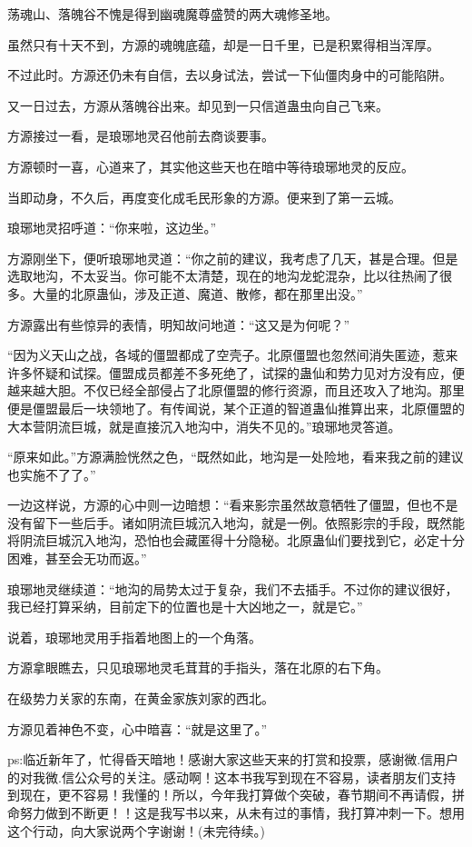 \begin{this_body}
荡魂山、落魄谷不愧是得到幽魂魔尊盛赞的两大魂修圣地。

虽然只有十天不到，方源的魂魄底蕴，却是一日千里，已是积累得相当浑厚。

不过此时。方源还仍未有自信，去以身试法，尝试一下仙僵肉身中的可能陷阱。

又一日过去，方源从落魄谷出来。却见到一只信道蛊虫向自己飞来。

方源接过一看，是琅琊地灵召他前去商谈要事。

方源顿时一喜，心道来了，其实他这些天也在暗中等待琅琊地灵的反应。

当即动身，不久后，再度变化成毛民形象的方源。便来到了第一云城。

琅琊地灵招呼道：“你来啦，这边坐。”

方源刚坐下，便听琅琊地灵道：“你之前的建议，我考虑了几天，甚是合理。但是选取地沟，不太妥当。你可能不太清楚，现在的地沟龙蛇混杂，比以往热闹了很多。大量的北原蛊仙，涉及正道、魔道、散修，都在那里出没。”

方源露出有些惊异的表情，明知故问地道：“这又是为何呢？”

“因为义天山之战，各域的僵盟都成了空壳子。北原僵盟也忽然间消失匿迹，惹来许多怀疑和试探。僵盟成员都差不多死绝了，试探的蛊仙和势力见对方没有应，便越来越大胆。不仅已经全部侵占了北原僵盟的修行资源，而且还攻入了地沟。那里便是僵盟最后一块领地了。有传闻说，某个正道的智道蛊仙推算出来，北原僵盟的大本营阴流巨城，就是直接沉入地沟中，消失不见的。”琅琊地灵答道。

“原来如此。”方源满脸恍然之色，“既然如此，地沟是一处险地，看来我之前的建议也实施不了了。”

一边这样说，方源的心中则一边暗想：“看来影宗虽然故意牺牲了僵盟，但也不是没有留下一些后手。诸如阴流巨城沉入地沟，就是一例。依照影宗的手段，既然能将阴流巨城沉入地沟，恐怕也会藏匿得十分隐秘。北原蛊仙们要找到它，必定十分困难，甚至会无功而返。”

琅琊地灵继续道：“地沟的局势太过于复杂，我们不去插手。不过你的建议很好，我已经打算采纳，目前定下的位置也是十大凶地之一，就是它。”

说着，琅琊地灵用手指着地图上的一个角落。

方源拿眼瞧去，只见琅琊地灵毛茸茸的手指头，落在北原的右下角。

在级势力关家的东南，在黄金家族刘家的西北。

方源见着神色不变，心中暗喜：“就是这里了。”

ps:临近新年了，忙得昏天暗地！感谢大家这些天来的打赏和投票，感谢微.信用户的对我微.信公众号的关注。感动啊！这本书我写到现在不容易，读者朋友们支持到现在，更不容易！我懂的！所以，今年我打算做个突破，春节期间不再请假，拼命努力做到不断更！！这是我写书以来，从未有过的事情，我打算冲刺一下。想用这个行动，向大家说两个字谢谢！(未完待续。)

\end{this_body}

